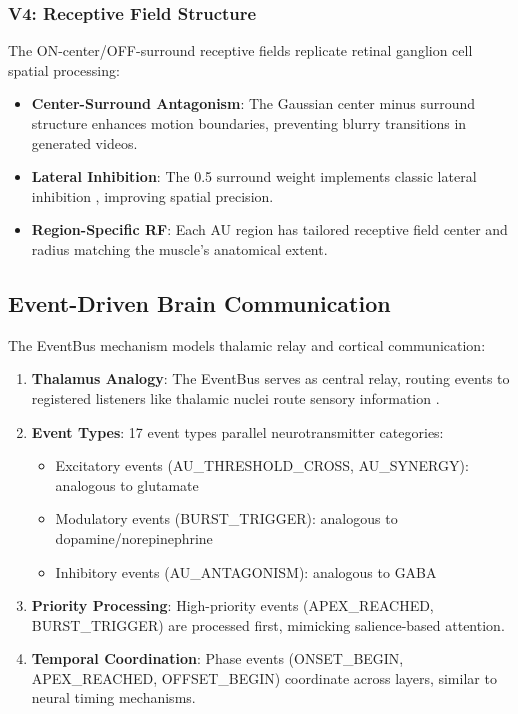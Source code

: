 \subsubsection{V4: Receptive Field Structure}

The ON-center/OFF-surround receptive fields replicate retinal ganglion cell spatial processing:

\begin{itemize}
\item \textbf{Center-Surround Antagonism}: The Gaussian center minus surround structure enhances motion boundaries, preventing blurry transitions in generated videos.
\item \textbf{Lateral Inhibition}: The 0.5 surround weight implements classic lateral inhibition \cite{hubel1962}, improving spatial precision.
\item \textbf{Region-Specific RF}: Each AU region has tailored receptive field center and radius matching the muscle's anatomical extent.
\end{itemize}

\subsection{Event-Driven Brain Communication}

The EventBus mechanism models thalamic relay and cortical communication:

\begin{enumerate}
\item \textbf{Thalamus Analogy}: The EventBus serves as central relay, routing events to registered listeners like thalamic nuclei route sensory information \cite{dayan2001}.

\item \textbf{Event Types}: 17 event types parallel neurotransmitter categories:
    \begin{itemize}
    \item Excitatory events (AU\_THRESHOLD\_CROSS, AU\_SYNERGY): analogous to glutamate
    \item Modulatory events (BURST\_TRIGGER): analogous to dopamine/norepinephrine
    \item Inhibitory events (AU\_ANTAGONISM): analogous to GABA
    \end{itemize}

\item \textbf{Priority Processing}: High-priority events (APEX\_REACHED, BURST\_TRIGGER) are processed first, mimicking salience-based attention.

\item \textbf{Temporal Coordination}: Phase events (ONSET\_BEGIN, APEX\_REACHED, OFFSET\_BEGIN) coordinate across layers, similar to neural timing mechanisms.
\end{enumerate}

